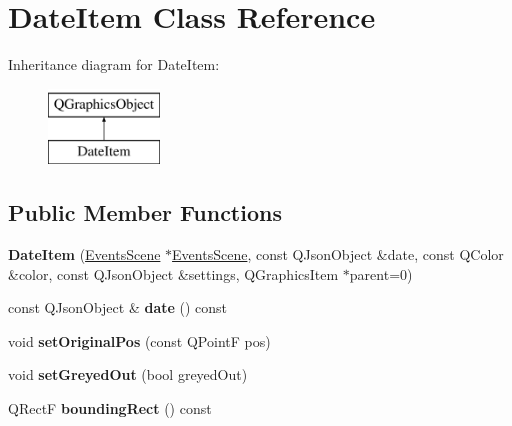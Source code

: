 \hypertarget{class_date_item}{\section{Date\-Item Class Reference}
\label{class_date_item}
}
Inheritance diagram for Date\-Item\-:\begin{figure}[H]
\begin{center}
\leavevmode
\includegraphics[height=2.000000cm]{class_date_item}
\end{center}
\end{figure}
\subsection*{Public Member Functions}
\begin{DoxyCompactItemize}
\item 
\hypertarget{class_date_item_a9e4416fd117464d85e3f705c3ba31763}{{\bfseries Date\-Item} (\hyperlink{class_events_scene}{Events\-Scene} $\ast$\hyperlink{class_events_scene}{Events\-Scene}, const Q\-Json\-Object \&date, const Q\-Color \&color, const Q\-Json\-Object \&settings, Q\-Graphics\-Item $\ast$parent=0)}\label{class_date_item_a9e4416fd117464d85e3f705c3ba31763}

\item 
\hypertarget{class_date_item_a29e2f59757400eed806937766cee7823}{const Q\-Json\-Object \& {\bfseries date} () const }\label{class_date_item_a29e2f59757400eed806937766cee7823}

\item 
\hypertarget{class_date_item_a2f0d380ed1a9984094472541b5fec793}{void {\bfseries set\-Original\-Pos} (const Q\-Point\-F pos)}\label{class_date_item_a2f0d380ed1a9984094472541b5fec793}

\item 
\hypertarget{class_date_item_afe348102af684b4c22f49ab01b4c43a6}{void {\bfseries set\-Greyed\-Out} (bool greyed\-Out)}\label{class_date_item_afe348102af684b4c22f49ab01b4c43a6}

\item 
\hypertarget{class_date_item_a528cce90f5fd7b0bf96b3f214e966b4a}{Q\-Rect\-F {\bfseries bounding\-Rect} () const }\label{class_date_item_a528cce90f5fd7b0bf96b3f214e966b4a}

\end{DoxyCompactItemize}
